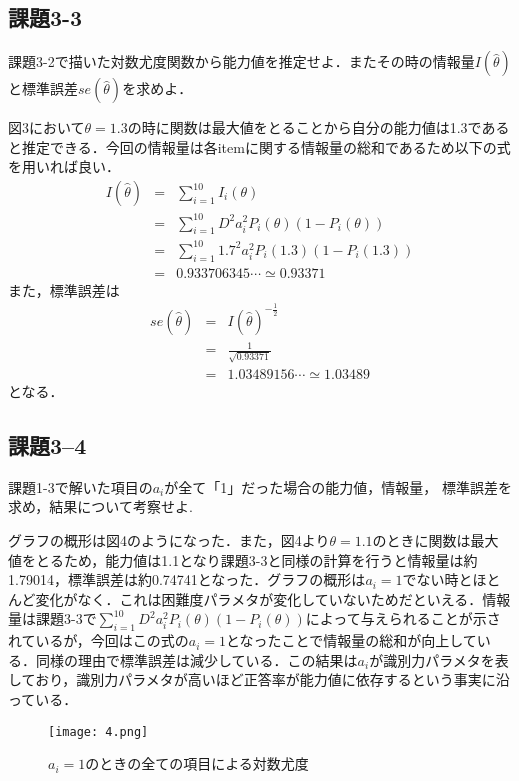 \documentclass[12pt]{jarticle}
\begin{document}
\subsection{課題3-3}
\begin{shadebox}
    \quad 課題3-2で描いた対数尤度関数から能力値を推定せよ．またその時の情報量$I(\hat{\theta})$と標準誤差$se(\hat{\theta})$を求めよ．
\end{shadebox}
\vspace{\baselineskip}
図3において$\theta=1.3$の時に関数は最大値をとることから自分の能力値は1.3であると推定できる．今回の情報量は各itemに関する情報量の総和であるため以下の式を用いれば良い．
\begin{eqnarray*}
    I(\hat{\theta})&=&\sum_{i=1}^{10}{I_i({\theta})}\\
    &=&\sum_{i=1}^{10}{D^2a_i^2P_i(\theta)(1-P_i(\theta))}\\
    &=&\sum_{i=1}^{10}{1.7^2a_i^2P_i(1.3)(1-P_i(1.3))}\\
    &=&0.933706345\cdots\simeq 0.93371
\end{eqnarray*}
また，標準誤差は
\begin{eqnarray*}
    se(\hat{\theta})&=&I(\hat{\theta})^{-\frac{1}{2}}\\
    &=&\frac{1}{\sqrt{0.93371}}\\
    &=&1.03489156\cdots\simeq 1.03489
\end{eqnarray*}
となる．

\subsection{課題3–4}
\begin{shadebox}
    \quad 課題1-3で解いた項目の$a_i$が全て「1」だった場合の能力値，情報量，
    標準誤差を求め，結果について考察せよ.
\end{shadebox}
\vspace{\baselineskip}
グラフの概形は図4のようになった．また，図4より$\theta=1.1$のときに関数は最大値をとるため，能力値は1.1となり課題3-3と同様の計算を行うと情報量は約1.79014，標準誤差は約0.74741となった．グラフの概形は$a_i=1$でない時とほとんど変化がなく．これは困難度パラメタが変化していないためだといえる．情報量は課題3-3で$\sum_{i=1}^{10}{D^2a_i^2P_i(\theta)(1-P_i(\theta))}$によって与えられることが示されているが，今回はこの式の$a_i=1$となったことで情報量の総和が向上している．同様の理由で標準誤差は減少している．この結果は$a_i$が識別力パラメタを表しており，識別力パラメタが高いほど正答率が能力値に依存するという事実に沿っている．
\begin{figure}[H]
    \begin{center}
        \texttt{[image: 4.png]}
    \end{center}
    \caption{$a_i=1$のときの全ての項目による対数尤度}
    \label{fig1}
\end{figure}
\end{document}
